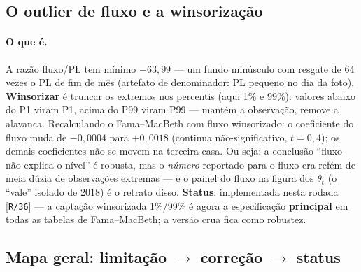 \documentclass[11pt,a4paper]{article}
\newcommand{\oquee}[0]{\paragraph{O que é.}}
\newcommand{\scriptref}[1]{{\footnotesize\color{cinza}[\texttt{#1}]}}
\begin{document}
\subsection{O outlier de fluxo e a winsorização}

\oquee A razão fluxo/PL tem mínimo $-63{,}99$ --- um fundo minúsculo com resgate de 64 vezes o PL
de fim de mês (artefato de denominador: PL pequeno no dia da foto). \textbf{Winsorizar} é truncar
os extremos nos percentis (aqui 1\% e 99\%): valores abaixo do P1 viram P1, acima do P99 viram
P99 --- mantém a observação, remove a alavanca. Recalculando o Fama--MacBeth com fluxo
winsorizado: o coeficiente do fluxo muda de $-0{,}0004$ para $+0{,}0018$ (continua
não-significativo, $t=0{,}4$); os demais coeficientes não se movem na terceira casa. Ou seja: a
conclusão ``fluxo não explica o nível'' é robusta, mas o \emph{número} reportado para o fluxo era
refém de meia dúzia de observações extremas --- e o painel do fluxo na figura dos $\theta_t$
(o ``vale'' isolado de 2018) é o retrato disso. \textbf{Status}: implementada nesta rodada
\scriptref{R/36} --- a captação winsorizada 1\%/99\% é agora a especificação \textbf{principal}
em todas as tabelas de Fama--MacBeth; a versão crua fica como robustez.

\subsection{Mapa geral: limitação $\to$ correção $\to$ status}
\end{document}
